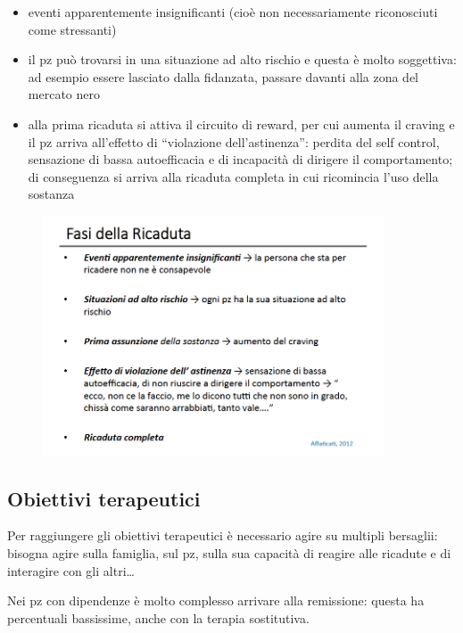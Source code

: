 \begin{itemize}
\item
  eventi apparentemente insignificanti (cioè non necessariamente
  riconosciuti come stressanti)
\item
  il pz può trovarsi in una situazione ad alto rischio e questa è molto
  soggettiva: ad esempio essere lasciato dalla fidanzata, passare
  davanti alla zona del mercato nero
\item
  alla prima ricaduta si attiva il circuito di reward, per cui aumenta
  il craving e il pz arriva all'effetto di ``violazione
  dell'astinenza'': perdita del self control, sensazione di bassa
  autoefficacia e di incapacità di dirigere il comportamento; di
  conseguenza si arriva alla ricaduta completa in cui ricomincia l'uso
  della sostanza
\end{itemize}

\begin{figure}[!ht]
\centering
	\includegraphics[width=0.9\textwidth]{017/image4.png}
\end{figure}

\subsection{Obiettivi terapeutici}

Per raggiungere gli obiettivi terapeutici è necessario agire su multipli
bersaglii: bisogna agire sulla famiglia, sul pz, sulla sua capacità di
reagire alle ricadute e di interagire con gli altri\ldots{}

Nei pz con dipendenze è molto complesso arrivare alla remissione: questa
ha percentuali bassissime, anche con la terapia sostitutiva.

